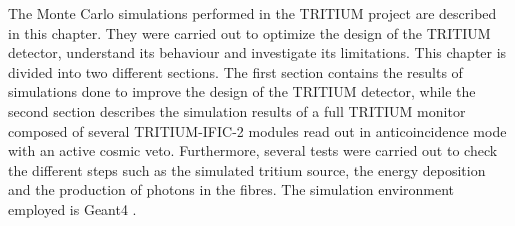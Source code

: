 The Monte Carlo simulations performed in the TRITIUM project are described in this chapter. They were carried out to optimize the design of the TRITIUM detector, understand its behaviour and investigate its limitations. This chapter is divided into two different sections. The first section contains the results of simulations done to improve the design of the TRITIUM detector, while the second section describes the simulation results of a full TRITIUM monitor composed of several TRITIUM-IFIC-2 modules read out in anticoincidence mode with an active cosmic veto. Furthermore, several tests were carried out to check the different steps such as the simulated tritium source, the energy deposition and the production of photons in the fibres. The simulation environment employed is Geant4 \cite{Geant4WebPage, Geant4P}.